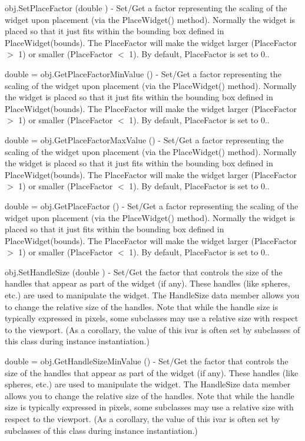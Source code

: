 \begin{DoxyItemize}
\item {\ttfamily obj.\-Set\-Place\-Factor (double )} -\/ Set/\-Get a factor representing the scaling of the widget upon placement (via the Place\-Widget() method). Normally the widget is placed so that it just fits within the bounding box defined in Place\-Widget(bounds). The Place\-Factor will make the widget larger (Place\-Factor $>$ 1) or smaller (Place\-Factor $<$ 1). By default, Place\-Factor is set to 0..  
\item {\ttfamily double = obj.\-Get\-Place\-Factor\-Min\-Value ()} -\/ Set/\-Get a factor representing the scaling of the widget upon placement (via the Place\-Widget() method). Normally the widget is placed so that it just fits within the bounding box defined in Place\-Widget(bounds). The Place\-Factor will make the widget larger (Place\-Factor $>$ 1) or smaller (Place\-Factor $<$ 1). By default, Place\-Factor is set to 0..  
\item {\ttfamily double = obj.\-Get\-Place\-Factor\-Max\-Value ()} -\/ Set/\-Get a factor representing the scaling of the widget upon placement (via the Place\-Widget() method). Normally the widget is placed so that it just fits within the bounding box defined in Place\-Widget(bounds). The Place\-Factor will make the widget larger (Place\-Factor $>$ 1) or smaller (Place\-Factor $<$ 1). By default, Place\-Factor is set to 0..  
\item {\ttfamily double = obj.\-Get\-Place\-Factor ()} -\/ Set/\-Get a factor representing the scaling of the widget upon placement (via the Place\-Widget() method). Normally the widget is placed so that it just fits within the bounding box defined in Place\-Widget(bounds). The Place\-Factor will make the widget larger (Place\-Factor $>$ 1) or smaller (Place\-Factor $<$ 1). By default, Place\-Factor is set to 0..  
\item {\ttfamily obj.\-Set\-Handle\-Size (double )} -\/ Set/\-Get the factor that controls the size of the handles that appear as part of the widget (if any). These handles (like spheres, etc.) are used to manipulate the widget. The Handle\-Size data member allows you to change the relative size of the handles. Note that while the handle size is typically expressed in pixels, some subclasses may use a relative size with respect to the viewport. (As a corollary, the value of this ivar is often set by subclasses of this class during instance instantiation.)  
\item {\ttfamily double = obj.\-Get\-Handle\-Size\-Min\-Value ()} -\/ Set/\-Get the factor that controls the size of the handles that appear as part of the widget (if any). These handles (like spheres, etc.) are used to manipulate the widget. The Handle\-Size data member allows you to change the relative size of the handles. Note that while the handle size is typically expressed in pixels, some subclasses may use a relative size with respect to the viewport. (As a corollary, the value of this ivar is often set by subclasses of this class during instance instantiation.)  

\end{DoxyItemize}
